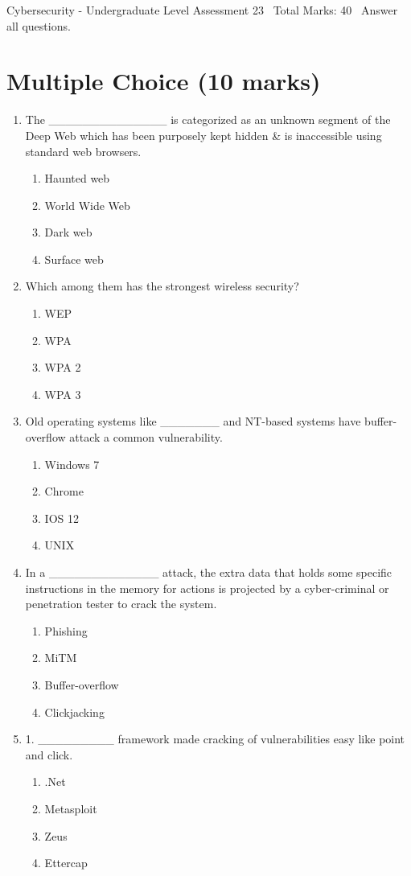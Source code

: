 \documentclass[12pt]{article}
\begin{document}
\begin{center}
Cybersecurity - Undergraduate Level Assessment 23 \
Total Marks: 40 \
Answer all questions.
\end{center}

\section*{Multiple Choice (10 marks)}
\begin{enumerate}[label=\arabic*.]
\item The \_\_\_\_\_\_\_\_\_\_\_\_\_\_ is categorized as an unknown segment of the Deep Web which has been purposely kept hidden \& is inaccessible using standard web browsers.
\begin{enumerate}[label=(\alph*)]
    \item Haunted web
    \item World Wide Web
    \item Dark web
    \item Surface web
\end{enumerate}
\item Which among them has the strongest wireless security?
\begin{enumerate}[label=(\alph*)]
    \item WEP
    \item WPA
    \item WPA 2
    \item WPA 3
\end{enumerate}
\item Old operating systems like \_\_\_\_\_\_\_ and NT-based systems have buffer-overflow attack a common vulnerability.
\begin{enumerate}[label=(\alph*)]
    \item Windows 7
    \item Chrome
    \item IOS 12
    \item UNIX
\end{enumerate}
\item In a \_\_\_\_\_\_\_\_\_\_\_\_\_ attack, the extra data that holds some specific instructions in the memory for actions is projected by a cyber-criminal or penetration tester to crack the system.
\begin{enumerate}[label=(\alph*)]
    \item Phishing
    \item MiTM
    \item Buffer-overflow
    \item Clickjacking
\end{enumerate}
\item 1. \_\_\_\_\_\_\_\_\_ framework made cracking of vulnerabilities easy like point and click.
\begin{enumerate}[label=(\alph*)]
    \item .Net
    \item Metasploit
    \item Zeus
    \item Ettercap
\end{enumerate}
\end{enumerate}
\end{document}
